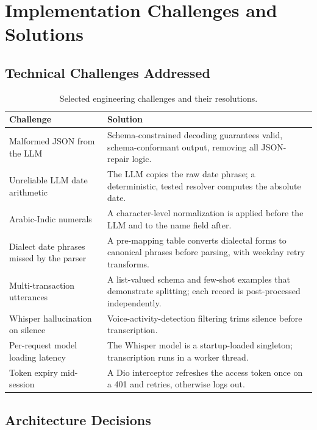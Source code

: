 \section{Implementation Challenges and Solutions}

\subsection{Technical Challenges Addressed}

\begin{table}[H]
\centering
\caption{Selected engineering challenges and their resolutions.}
\label{tab:challenges}
\small
\renewcommand{\arraystretch}{1.3}
\begin{tabularx}{\textwidth}{>{\raggedright\arraybackslash}p{4.2cm} X}
\toprule
\textbf{Challenge} & \textbf{Solution} \\
\midrule
Malformed JSON from the LLM & Schema-constrained decoding guarantees valid,
schema-conformant output, removing all JSON-repair logic. \\
Unreliable LLM date arithmetic & The LLM copies the raw date phrase; a
deterministic, tested resolver computes the absolute date. \\
Arabic-Indic numerals & A character-level normalization is applied before the LLM
and to the name field after. \\
Dialect date phrases missed by the parser & A pre-mapping table converts dialectal
forms to canonical phrases before parsing, with weekday retry transforms. \\
Multi-transaction utterances & A list-valued schema and few-shot examples that
demonstrate splitting; each record is post-processed independently. \\
Whisper hallucination on silence & Voice-activity-detection filtering trims silence
before transcription. \\
Per-request model loading latency & The Whisper model is a startup-loaded singleton;
transcription runs in a worker thread. \\
Token expiry mid-session & A Dio interceptor refreshes the access token once on a
401 and retries, otherwise logs out. \\
\bottomrule
\end{tabularx}
\end{table}

\subsection{Architecture Decisions}

